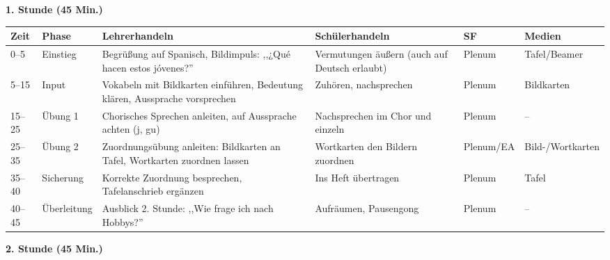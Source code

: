 \documentclass[11pt,a4paper]{article}
\begin{document}
\textbf{1. Stunde (45 Min.)}

\begin{longtable}{|p{1cm}|p{1.5cm}|p{4cm}|p{3cm}|p{2cm}|p{2cm}|}
\hline
\textbf{Zeit} & \textbf{Phase} & \textbf{Lehrerhandeln} & \textbf{Schülerhandeln} & \textbf{SF} & \textbf{Medien} \\
\hline
\endhead

0--5 & Einstieg & Begrüßung auf Spanisch, Bildimpuls: ,,¿Qué hacen estos jóvenes?'' & Vermutungen äußern (auch auf Deutsch erlaubt) & Plenum & Tafel/Beamer \\
\hline

5--15 & Input & Vokabeln mit Bildkarten einführen, Bedeutung klären, Aussprache vorsprechen & Zuhören, nachsprechen & Plenum & Bildkarten \\
\hline

15--25 & Übung 1 & Chorisches Sprechen anleiten, auf Aussprache achten (j, gu) & Nachsprechen im Chor und einzeln & Plenum & -- \\
\hline

25--35 & Übung 2 & Zuordnungsübung anleiten: Bildkarten an Tafel, Wortkarten zuordnen lassen & Wortkarten den Bildern zuordnen & Plenum/EA & Bild-/Wortkarten \\
\hline

35--40 & Sicherung & Korrekte Zuordnung besprechen, Tafelanschrieb ergänzen & Ins Heft übertragen & Plenum & Tafel \\
\hline

40--45 & Über\-leitung & Ausblick 2. Stunde: ,,Wie frage ich nach Hobbys?'' & Aufräumen, Pausengong & Plenum & -- \\
\hline
\end{longtable}

\vspace{1em}

\textbf{2. Stunde (45 Min.)}
\end{document}
